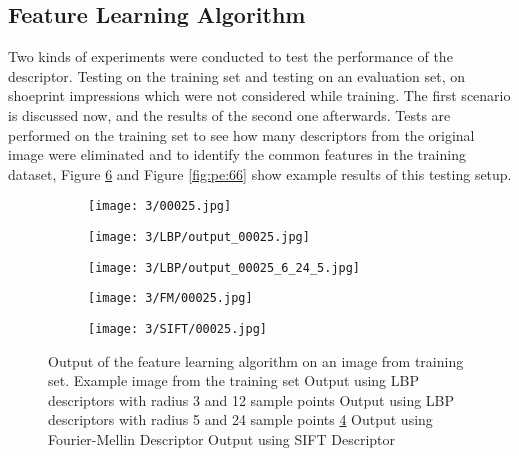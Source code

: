 \documentclass[draft,final]{vutinfth} %
\begin{document}
\subsection{Feature Learning Algorithm}
\par
Two kinds of experiments were conducted to test the performance of the descriptor.
Testing on the training set and testing on an evaluation set, on shoeprint impressions which were not considered while training.
The first scenario is discussed now, and the results of the second one afterwards.
Tests are performed on the training set to see how many descriptors from the original image were eliminated and to identify the common features in the training dataset, Figure \ref{fig:pe:25} and Figure \ref{fig:pe:66} show example results of this testing setup.

\begin{figure}[h]
  \centering
  \begin{subfigure}[t]{0.19\columnwidth}
    \centering
    \texttt{[image: 3/00025.jpg]}
    \subcaption{}
    \label{fig:pe:25:orig}
  \end{subfigure}
  \begin{subfigure}[t]{0.19\columnwidth}
    \centering
    \texttt{[image: 3/LBP/output\_00025.jpg]}
    \subcaption{}
    \label{fig:pe:25:LBPs}
  \end{subfigure}
  \begin{subfigure}[t]{0.19\columnwidth}
    \centering
    \texttt{[image: 3/LBP/output\_00025\_6\_24\_5.jpg]}
    \subcaption{}
    \label{fig:pe:25:LBPb}
  \end{subfigure}
  \begin{subfigure}[t]{0.19\columnwidth}
    \centering
    \texttt{[image: 3/FM/00025.jpg]}
    \subcaption{}
    \label{fig:pe:25:FM}
  \end{subfigure}
  \begin{subfigure}[t]{0.19\columnwidth}
    \centering
    \texttt{[image: 3/SIFT/00025.jpg]}
    \subcaption{}
    \label{fig:pe:25:SIFT}
  \end{subfigure}
  \caption{Output of the feature learning algorithm on an image from training set. Example image from the training set  Output using LBP descriptors with radius 3 and 12 sample points  Output using LBP descriptors with radius 5 and 24 sample points \ref{fig:pe:25:FM} Output using Fourier-Mellin Descriptor  Output using SIFT Descriptor}
  \label{fig:pe:25}
\end{figure}
\end{document}
